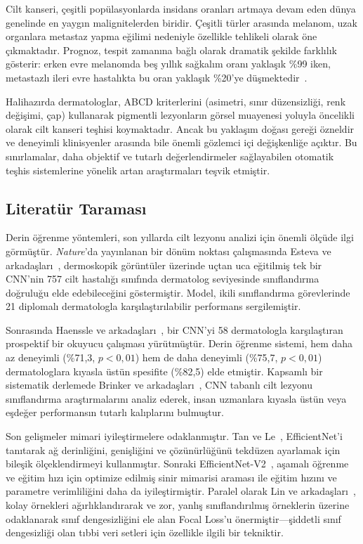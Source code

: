 \documentclass[12pt,a4paper]{article}
\begin{document}
Cilt kanseri, çeşitli popülasyonlarda insidans oranları artmaya devam eden dünya genelinde en yaygın malignitelerden biridir. Çeşitli türler arasında melanom, uzak organlara metastaz yapma eğilimi nedeniyle özellikle tehlikeli olarak öne çıkmaktadır. Prognoz, tespit zamanına bağlı olarak dramatik şekilde farklılık gösterir: erken evre melanomda beş yıllık sağkalım oranı yaklaşık \%99 iken, metastazlı ileri evre hastalıkta bu oran yaklaşık \%20'ye düşmektedir~\cite{esteva2017}.

Halihazırda dermatologlar, ABCD kriterlerini (asimetri, sınır düzensizliği, renk değişimi, çap) kullanarak pigmentli lezyonların görsel muayenesi yoluyla öncelikli olarak cilt kanseri teşhisi koymaktadır. Ancak bu yaklaşım doğası gereği özneldir ve deneyimli klinisyenler arasında bile önemli gözlemci içi değişkenliğe açıktır. Bu sınırlamalar, daha objektif ve tutarlı değerlendirmeler sağlayabilen otomatik teşhis sistemlerine yönelik artan araştırmaları teşvik etmiştir.

\subsection{Literatür Taraması}

Derin öğrenme yöntemleri, son yıllarda cilt lezyonu analizi için önemli ölçüde ilgi görmüştür. \textit{Nature}'da yayınlanan bir dönüm noktası çalışmasında Esteva ve arkadaşları~\cite{esteva2017}, dermoskopik görüntüler üzerinde uçtan uca eğitilmiş tek bir CNN'nin 757 cilt hastalığı sınıfında dermatolog seviyesinde sınıflandırma doğruluğu elde edebileceğini göstermiştir. Model, ikili sınıflandırma görevlerinde 21 diplomalı dermatologla karşılaştırılabilir performans sergilemiştir.

Sonrasında Haenssle ve arkadaşları~\cite{haenssle2018}, bir CNN'yi 58 dermatologla karşılaştıran prospektif bir okuyucu çalışması yürütmüştür. Derin öğrenme sistemi, hem daha az deneyimli (\%71,3, $p < 0,01$) hem de daha deneyimli (\%75,7, $p < 0,01$) dermatologlara kıyasla üstün spesifite (\%82,5) elde etmiştir. Kapsamlı bir sistematik derlemede Brinker ve arkadaşları~\cite{brinker2019}, CNN tabanlı cilt lezyonu sınıflandırma araştırmalarını analiz ederek, insan uzmanlara kıyasla üstün veya eşdeğer performansın tutarlı kalıplarını bulmuştur.

Son gelişmeler mimari iyileştirmelere odaklanmıştır. Tan ve Le~\cite{tan2019}, EfficientNet'i tanıtarak ağ derinliğini, genişliğini ve çözünürlüğünü tekdüzen ayarlamak için bileşik ölçeklendirmeyi kullanmıştır. Sonraki EfficientNet-V2~\cite{tan2021}, aşamalı öğrenme ve eğitim hızı için optimize edilmiş sinir mimarisi araması ile eğitim hızını ve parametre verimliliğini daha da iyileştirmiştir. Paralel olarak Lin ve arkadaşları~\cite{lin2017}, kolay örnekleri ağırlıklandırarak ve zor, yanlış sınıflandırılmış örneklerin üzerine odaklanarak sınıf dengesizliğini ele alan Focal Loss'u önermiştir---şiddetli sınıf dengesizliği olan tıbbi veri setleri için özellikle ilgili bir tekniktir.
\end{document}
